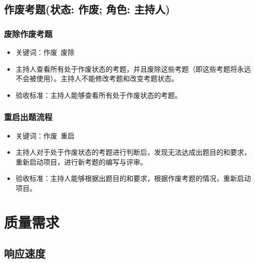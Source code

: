 \documentclass[hyperref, a4paper]{ctexart}
\begin{document}
\hypertarget{ux4f5cux5e9fux8003ux9898ux72b6ux6001-ux4f5cux5e9f-ux89d2ux8272-ux4e3bux6301ux4eba}{%
\subsection{作废考题(状态: 作废; 角色:
主持人)}\label{ux4f5cux5e9fux8003ux9898ux72b6ux6001-ux4f5cux5e9f-ux89d2ux8272-ux4e3bux6301ux4eba}}

\hypertarget{ux5e9fux9664ux4f5cux5e9fux8003ux9898}{%
\subsubsection{废除作废考题}\label{ux5e9fux9664ux4f5cux5e9fux8003ux9898}}

\begin{itemize}
\item
  关键词：作废~废除
\item
  主持人查看所有处于作废状态的考题，并且废除这些考题（即这些考题将永远不会被使用）。主持人不能修改考题和改变考题状态。
\item
  验收标准：主持人能够查看所有处于作废状态的考题。
\end{itemize}

\hypertarget{ux91cdux542fux51faux9898ux6d41ux7a0b}{%
\subsubsection{重启出题流程}\label{ux91cdux542fux51faux9898ux6d41ux7a0b}}

\begin{itemize}
\item
  关键词：作废~重启
\item
  主持人对于处于作废状态的考题进行判断后，发现无法达成出题目的和要求，重新启动项目，进行新考题的编写与评审。
\item
  验收标准：主持人能够根据出题目的和要求，根据作废考题的情况，重新启动项目。
\end{itemize}

\hypertarget{ux8d28ux91cfux9700ux6c42}{%
\section{质量需求}\label{ux8d28ux91cfux9700ux6c42}}

\hypertarget{ux54cdux5e94ux901fux5ea6}{%
\subsection{响应速度}\label{ux54cdux5e94ux901fux5ea6}}
\end{document}
